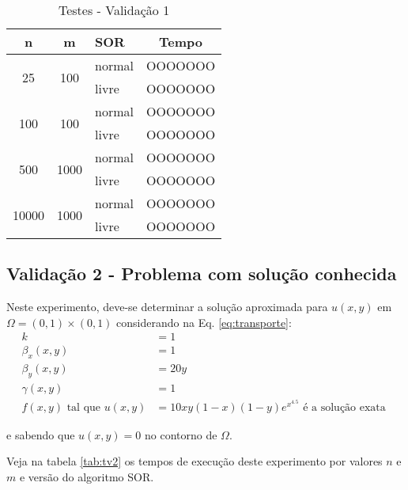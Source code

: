 \documentclass[
	11pt,				%
	oneside,			%
	a4paper,			%
	english,			%
	brazil,				%
	]{article}
\begin{document}
\begin{table}[ht]
\centering
\begin{tabular}{|c|c|l|c|}
\hline 
\textbf{n} & \textbf{m} & \textbf{SOR} & \textbf{Tempo} \\
\hline
\multirow{2}{*}{25}    & \multirow{2}{*}{100}  & normal & OOOOOOO \\
                       &                       & livre  & OOOOOOO \\
\hline
\multirow{2}{*}{100}   & \multirow{2}{*}{100}  & normal & OOOOOOO \\
                       &                       & livre  & OOOOOOO \\
\hline
\multirow{2}{*}{500}   & \multirow{2}{*}{1000} & normal & OOOOOOO \\
                       &                       & livre  & OOOOOOO \\
\hline
\multirow{2}{*}{10000} & \multirow{2}{*}{1000} & normal & OOOOOOO \\
                       &                       & livre  & OOOOOOO \\
\hline
\end{tabular}
\caption{Testes - Validação 1}
\label{tab:tv1}
\end{table}

\subsection{Validação 2 - Problema com solução conhecida}
Neste experimento, deve-se determinar a solução aproximada para
$u(x,y)$ em $\Omega = (0,1) \times (0,1)$ considerando na Eq. 
\eqref{eq:transporte}:
\begin{align}\label{eq:v2}
k &= 1\nonumber \\
\beta_x(x,y) &= 1\nonumber \\
\beta_y(x,y) &= 20y\nonumber \\
\gamma(x,y) &= 1\nonumber \\
f(x,y) \text{ tal que } u(x,y) &= 10xy(1-x)(1-y)e^{x^{4.5}}
\text{ é a solução exata }
\end{align}

e sabendo que $u(x,y) = 0$ no contorno de $\Omega$.

Veja na tabela \ref{tab:tv2} os tempos de execução deste experimento
por valores $n$ e $m$ e versão do algoritmo SOR.
\end{document}

